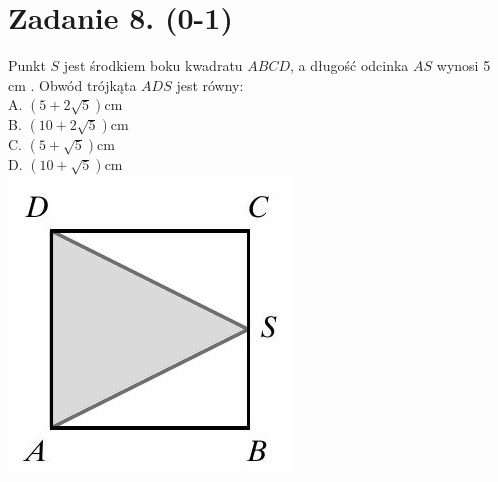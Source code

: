 \documentclass[10pt]{article}
\begin{document}
\section*{Zadanie 8. (0-1)}
Punkt \(S\) jest środkiem boku kwadratu \(A B C D\), a długość odcinka \(A S\) wynosi 5 cm . Obwód trójkąta \(A D S\) jest równy:\\
A. \((5+2 \sqrt{5}) \mathrm{cm}\)\\
B. \((10+2 \sqrt{5}) \mathrm{cm}\)\\
C. \((5+\sqrt{5}) \mathrm{cm}\)\\
D. \((10+\sqrt{5}) \mathrm{cm}\)\\
\includegraphics[max width=\textwidth, center]{2024_11_21_6574e892c2387ce90f12g-04(1)}
\end{document}

